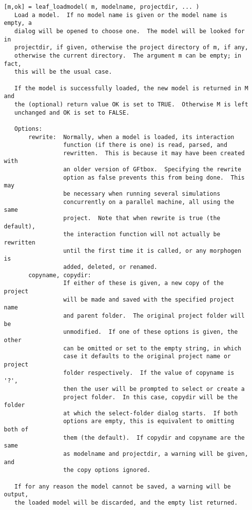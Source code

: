 \begin{verbatim}
[m,ok] = leaf_loadmodel( m, modelname, projectdir, ... )
   Load a model.  If no model name is given or the model name is empty, a
   dialog will be opened to choose one.  The model will be looked for in
   projectdir, if given, otherwise the project directory of m, if any,
   otherwise the current directory.  The argument m can be empty; in fact,
   this will be the usual case.

   If the model is successfully loaded, the new model is returned in M and
   the (optional) return value OK is set to TRUE.  Otherwise M is left
   unchanged and OK is set to FALSE.

   Options:
       rewrite:  Normally, when a model is loaded, its interaction
                 function (if there is one) is read, parsed, and
                 rewritten.  This is because it may have been created with
                 an older version of GFtbox.  Specifying the rewrite
                 option as false prevents this from being done.  This may
                 be necessary when running several simulations
                 concurrently on a parallel machine, all using the same
                 project.  Note that when rewrite is true (the default),
                 the interaction function will not actually be rewritten
                 until the first time it is called, or any morphogen is
                 added, deleted, or renamed.
       copyname, copydir:
                 If either of these is given, a new copy of the project
                 will be made and saved with the specified project name
                 and parent folder.  The original project folder will be
                 unmodified.  If one of these options is given, the other
                 can be omitted or set to the empty string, in which
                 case it defaults to the original project name or project
                 folder respectively.  If the value of copyname is '?',
                 then the user will be prompted to select or create a
                 project folder.  In this case, copydir will be the folder
                 at which the select-folder dialog starts.  If both
                 options are empty, this is equivalent to omitting both of
                 them (the default).  If copydir and copyname are the same
                 as modelname and projectdir, a warning will be given, and
                 the copy options ignored.

   If for any reason the model cannot be saved, a warning will be output,
   the loaded model will be discarded, and the empty list returned.


\end{verbatim}
